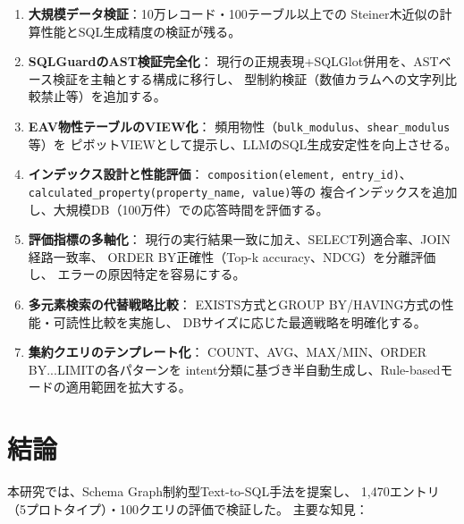 \documentclass[5p,twocolumn]{elsarticle}
\begin{document}
\begin{enumerate}
    プロトタイプ同義語もCrystallographic Open Database等の
    外部オントロジーとの連携により自動拡充を検討する。
  \item \textbf{大規模データ検証}：10万レコード・100テーブル以上での
    Steiner木近似の計算性能とSQL生成精度の検証が残る。
  \item \textbf{SQLGuardのAST検証完全化}：
    現行の正規表現+SQLGlot併用を、ASTベース検証を主軸とする構成に移行し、
    型制約検証（数値カラムへの文字列比較禁止等）を追加する。
  \item \textbf{EAV物性テーブルのVIEW化}：
    頻用物性（\texttt{bulk\_modulus}、\texttt{shear\_modulus}等）を
    ピボットVIEWとして提示し、LLMのSQL生成安定性を向上させる。
  \item \textbf{インデックス設計と性能評価}：
    \texttt{composition(element, entry\_id)}、
    \texttt{calculated\_property(property\_name, value)}等の
    複合インデックスを追加し、大規模DB（100万件）での応答時間を評価する。
  \item \textbf{評価指標の多軸化}：
    現行の実行結果一致に加え、SELECT列適合率、JOIN経路一致率、
    ORDER BY正確性（Top-k accuracy、NDCG）を分離評価し、
    エラーの原因特定を容易にする。
  \item \textbf{多元素検索の代替戦略比較}：
    EXISTS方式とGROUP BY/HAVING方式の性能・可読性比較を実施し、
    DBサイズに応じた最適戦略を明確化する。
  \item \textbf{集約クエリのテンプレート化}：
    COUNT、AVG、MAX/MIN、ORDER BY...LIMITの各パターンを
    intent分類に基づき半自動生成し、Rule-basedモードの適用範囲を拡大する。
\end{enumerate}

\section{結論}
\label{sec:conclusion}

本研究では、Schema Graph制約型Text-to-SQL手法を提案し、
1{,}470エントリ（5プロトタイプ）・100クエリの評価で検証した。
主要な知見：
\end{document}

